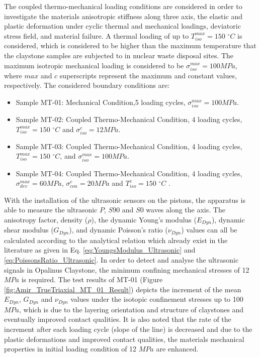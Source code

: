 The coupled thermo-mechanical loading conditions are considered in order to investigate the materials anisotropic stiffness along three axis, the elastic and plastic deformation under cyclic thermal and mechanical loadings, deviatoric stress field, and material failure. A thermal loading of up to $T_{iso}^{max}=150$ $^{\circ}C$ is considered, which is considered to be higher than the maximum temperature that the claystone samples are subjected to in nuclear waste disposal sites. The maximum isotropic mechanical loading is considered to be $\sigma_{iso}^{max}=100 MPa$, where $max$ and $c$ superscripts represent the maximum and constant values, respectively. The considered boundary conditions are:


\begin{itemize}
  \item Sample MT-01: Mechanical Condition,5 loading cycles, $\sigma_{iso}^{max}=100 MPa$.
  \item Sample MT-02: Coupled Thermo-Mechanical Condition, 4 loading cycles, $T_{iso}^{max}=150$ $^{\circ}C$ and $\sigma_{iso}^{c}=12 MPa$.
  \item Sample MT-03: Coupled Thermo-Mechanical Condition, 4 loading cycles, $T_{iso}^{max}=150$ $^{\circ}C$, and $\sigma_{iso}^{max}=100 MPa$.
  \item Sample MT-04: Coupled Thermo-Mechanical Condition, 4 loading cycles, $\sigma_{dev}^{max}=60 MPa$, $\sigma_{con}^{c}= 20 MPa$ and $T_{iso}^{c}=150$ $^{\circ}C$ .
\end{itemize}


With the installation of the ultrasonic sensors on the pistons, the apparatus is able to measure the ultrasonic $P$, $S90$ and $S0$ waves along the axis. The anisotropy factor, density ($\rho$), the dynamic Young’s modulus ($E_{Dyn}$), dynamic shear modulus ($G_{Dyn}$), and dynamic Poisson’s ratio ($\nu_{Dyn}$) values can all be calculated according to the analytical relation which already exist in the literature \cite{Motraetal2018} as given in Eq. \ref{eq:YoungsModulus_Ultrasonic} and \ref{eq:PoissonsRatio_Ultrasonic}. In order to detect and analyse the ultrasonic signals in Opalinus Claystone, the minimum confining mechanical stresses of 12 $MPa$ is required. The test results of MT-01 (Figure \ref{fig:Amir_TrueTriaxial_MT_01_Result}) depicts the increment of the mean $E_{Dyn}$, $G_{Dyn}$ and $\nu_{Dyn}$ values under the isotopic confinement stresses up to 100 $MPa$, which is due to the layering orientation and structure of claystones and eventually improved contact qualities. It is also noted that the rate of the increment after each loading cycle (slope of the line) is decreased and due to the plastic deformations and improved contact qualities, the materials mechanical properties in initial loading condition of 12 $MPa$ are enhanced. 



